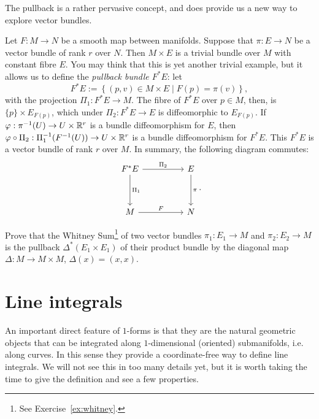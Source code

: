 The pullback is a rather pervasive concept, and does provide us a new way to explore vector bundles.

\begin{example}
  Let $F:M\to N$ be a smooth map between manifolds. Suppose that $\pi: E \to N$ be a vector bundle of rank $r$ over $N$.
  Then $M\times E$ is a trivial bundle over $M$ with constant fibre $E$.
  You may think that this is yet another trivial example, but it allows us to define the \emph{pullback bundle $F^* E$}: let
  \begin{equation}
    F^* E := \left\lbrace (p, v) \in M\times E \mid F(p) = \pi(v)\right\rbrace,
  \end{equation}
  with the projection $\Pi_1:F^* E \to M$.
  The fibre of $F^*E$ over $p\in M$, then, is $\{p\}\times E_{F(p)}$, which under $\Pi_2:F^* E \to E$ is diffeomorphic to $E_{F(p)}$.
  If $\varphi : \pi^{-1}(U) \to U\times\mathbb{R}^r$ is a bundle diffeomorphism for $E$, then $\varphi\circ\Pi_2: \Pi_1^{-1}(F^{-1}(U)) \to U\times\mathbb{R}^r$ is a bundle diffeomorphism for $F^*E$.
  This $F^*E$ is a vector bundle of rank $r$ over $M$.
  In summary, the following diagram commutes:
  \begin{equation}
    \begin{tikzcd}[row sep=huge, column sep=huge]
      F^* E \arrow[r, "\Pi_2"] \arrow[d, "\Pi_1"]
      & E \arrow[d, "\pi"] \\
      M \arrow[r, "F"]
      & N
    \end{tikzcd}.
  \end{equation}
\end{example}

\begin{exercise}
  Prove that the Whitney Sum\footnote{See Exercise~\ref{ex:whitney}.} 
  of two vector bundles $\pi_1 : E_1 \to M$ and $\pi_2 : E_2 \to M$
  is the pullback $\Delta^*(E_1 \times E_1)$ of their product bundle by the diagonal map
  $\Delta : M \to M \times M$, $\Delta(x) = (x, x)$.
\end{exercise}

\section{Line integrals}

An important direct feature of $1$-forms is that they are the natural geometric objects that can be integrated along $1$-dimensional (oriented) submanifolds, i.e. along curves.
In this sense they provide a coordinate-free way to define line integrals.
We will not see this in too many details yet, but it is worth taking the time to give the definition and see a few properties.

